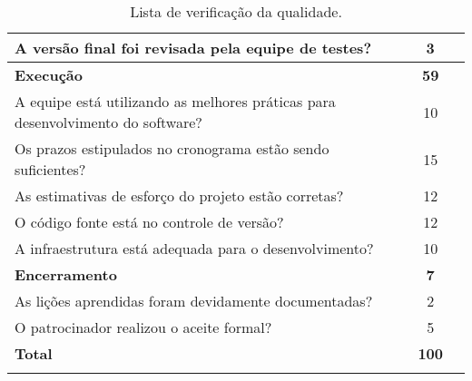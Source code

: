 \begin{longtable}{ p{} c c }
    \midrule
	A versão final foi revisada pela equipe de testes?                               & 3                        &                          \\
    \midrule
    \toprule
	\textbf{Execução}                                                               & \textbf{59}              &                          \\
    \bottomrule
	A equipe está utilizando as melhores práticas para desenvolvimento do software? & 10                       &                          \\
    \midrule
	Os prazos estipulados no cronograma estão sendo suficientes?                     & 15                       &                          \\
    \midrule
	As estimativas de esforço do projeto estão corretas?                            & 12                       &                          \\
    \midrule
	O código fonte está no controle de versão?                                     & 12                       &                          \\
    \midrule
	A infraestrutura está adequada para o desenvolvimento?                           & 10                       &                          \\
    \midrule
    \toprule
	\textbf{Encerramento}                                                             & \textbf{7}               &                          \\
    \bottomrule
	As lições aprendidas foram devidamente documentadas?                            & 2                        &                          \\
    \midrule
	O patrocinador realizou o aceite formal?                                          & 5                        &                          \\
    \midrule
    \toprule
	\textbf{Total}                                                                    & \textbf{100}             &                          \\
	\bottomrule
	\caption{Lista de verificação da qualidade.}
	\label{tab:quality-checklist}
	\centering
\end{longtable}